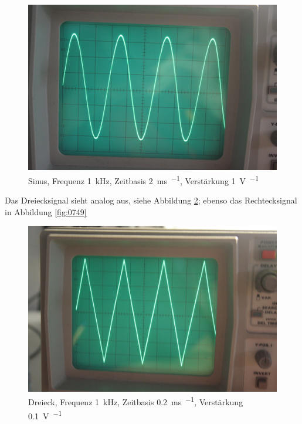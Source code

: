 \begin{figure}
	\centering
	\begin{minipage}{.45\linewidth}
	\end{minipage}
	\hfill
	\begin{minipage}{.45\linewidth}
	\includegraphics[width=\linewidth]{Fotos/IMG_0745-1500.jpg}
	\end{minipage}
	\caption{%
		Sinus, Frequenz \SI{1}{\kilo\hertz}, Zeitbasis \SI{2}{\milli\second\per\division}, Verstärkung \SI{1}{\volt\per\division}
	}
	\label{fig:0745}
\end{figure}

Das Dreiecksignal sieht analog aus, siehe Abbildung \ref{fig:0746}; ebenso das Rechtecksignal in Abbildung \ref{fig:0749}

\begin{figure}
	\centering
	\begin{minipage}{.45\linewidth}
	\end{minipage}
	\hfill
	\begin{minipage}{.45\linewidth}
	\includegraphics[width=\linewidth]{Fotos/IMG_0746-1500.jpg}
	\end{minipage}
	\caption{%
		Dreieck, Frequenz \SI{1}{\kilo\hertz}, Zeitbasis \SI{.2}{\milli\second\per\division}, Verstärkung \SI{.1}{\volt\per\division}
	}
	\label{fig:0746}
\end{figure}

